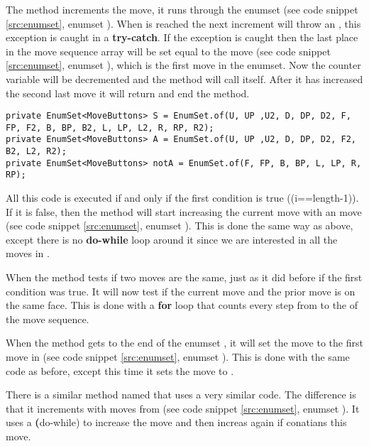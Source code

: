 The method increments the move, it runs through the enumset  (see code snippet \ref{src:enumset}, enumset ).
When  is reached the next increment will throw an , this exception is caught in a \textbf{try-catch}.
If the exception is caught then the last place in the move sequence array will be set equal to the move (see code snippet \ref{src:enumset}, enumset ), which is the first move in the enumset.
Now the counter variable  will be decremented and the method will call itself.
After it has increased the second last move it will return and end the method.

\begin{lstlisting}[style=sourceCode, caption=\myCaption{The definition of the enumsets S, A, and notA.}, label=src:enumset]
private EnumSet<MoveButtons> S = EnumSet.of(U, UP ,U2, D, DP, D2, F, FP, F2, B, BP, B2, L, LP, L2, R, RP, R2);
private EnumSet<MoveButtons> A = EnumSet.of(U, UP ,U2, D, DP, D2, F2, B2, L2, R2);
private EnumSet<MoveButtons> notA = EnumSet.of(F, FP, B, BP, L, LP, R, RP);
\end{lstlisting}

All this code is executed if and only if the first condition is true (\vr(i==length-1)).
If it is false, then the method will start increasing the current move with an  move (see code snippet \ref{src:enumset}, enumset ).
This is done the same way as above, except there is no \textbf{do-while} loop around it since we are interested in all the moves in .

When the method tests if two moves are the same, just as it did before if the first condition was true.
It will now test if the current move and the prior move is on the same face.
This is done with a \textbf{for} loop that counts every step from  to the  of the move sequence.

When the method gets to the end of the enumset , it will set the move to the first move in  (see code snippet \ref{src:enumset}, enumset ).
This is done with the same code as before, except this time it sets the move to .

There is a similar method named  that uses a very similar code.
The difference is that it increments with moves from  (see code snippet \ref{src:enumset}, enumset ).
It uses a \textbf(do-while) to increase the move  and then increas again if  conatians this move.